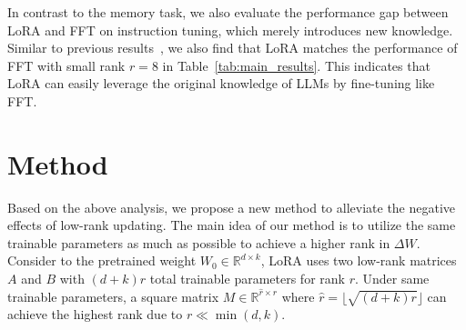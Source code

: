 \documentclass[11pt]{article}
\begin{document}
In contrast to the memory task, we also evaluate the performance gap between LoRA and FFT on instruction tuning, which merely introduces new knowledge.
Similar to previous results~\cite{meng2024periodiclora, zhu2024asymmetry}, we also find that LoRA matches the performance of FFT with small rank $r=8$ in Table~\ref{tab:main_results}.
This indicates that LoRA can easily leverage the original knowledge of LLMs by fine-tuning like FFT.

\section{Method}
\label{sec:41}

Based on the above analysis, we propose a new method to alleviate the negative effects of low-rank updating. The main idea of our method is to utilize the same trainable parameters as much as possible to achieve a higher rank in $\Delta W$.
Consider to the pretrained weight $W_0 \in \mathbb{R}^{d \times k}$, LoRA uses two low-rank matrices $A$ and $B$ with $(d+k)r$ total trainable parameters for rank $r$.
Under same trainable parameters, a square matrix $M \in \mathbb{R}^{\hat{r} \times \hat{r}}$ where $\hat{r} = \lfloor \sqrt{(d+k)r} \rfloor$ can achieve the highest rank due to $r \ll \min (d, k)$.
\end{document}
